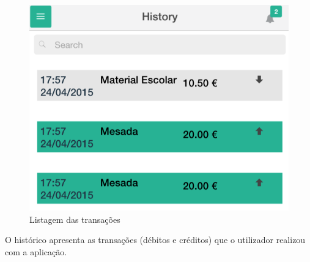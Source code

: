 \begin{figure}[H]
	\begin{center}
		\includegraphics[width=0.5
		\textwidth]{history/history.png}
	\end{center}
	\caption{Listagem das transações}
	\label{fig:5}
\end{figure}

O histórico apresenta as transações (débitos e créditos) que o utilizador realizou com a aplicação.